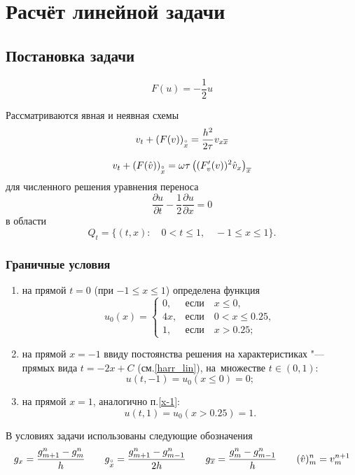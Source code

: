 \newpage
\section{Расчёт линейной задачи}

\subsection{Постановка задачи}
\[
F(u) = -\frac{1}{2} u
\]

Рассматриваются явная и неявная схемы
\begin{equation}\label{one}
v_t + (F(v))_{ \overset{\circ}{x} } = \frac{h^2}{2\tau} v_{x \overline{x}}
\end{equation}

\begin{equation}\label{two}
v_t + (F(\hat{v}))_{ \overset{\circ}{x} } = \omega \tau \left((F'_v(v))^2 \hat{v}_x \right)_{\overline{x}}
\end{equation}
для численного решения уравнения переноса 
\[
\frac{\partial u}{\partial t} - \frac{1}{2} 
\frac{\partial u}{\partial x} = 0
\]
в области
\begin{equation}\label{line}
Q_t = \{(t,x): \quad 0<t \le 1, \quad -1 \le x \le 1 \}.
\end{equation}

\subsubsection{Граничные условия}
\begin{enumerate}
\item на прямой $t = 0$ (при $-1 \le x \le 1$) определена функция
\begin{equation}\label{gran}
u_0(x) = 
\begin{cases}
0,& \text{если} \quad x \le 0, \\
4x,& \text{если} \quad 0 < x \le 0.25, \\
1,& \text{если} \quad x > 0.25;
\end{cases}
\end{equation}
\item\label{x-1} на прямой $x = -1$ ввиду постоянства решения на характеристиках "--- прямых вида $t = -2x + C$ (см.\ref{harr_lin}), на~множестве $t \in (0,1)$:
\[
u(t,-1) = u_0(x \le 0) = 0;
\]
\item на прямой $x = 1$, аналогично п.\ref{x-1}:
\[
u(t,1) = u_0(x > 0.25) = 1.
\]
\end{enumerate}

В условиях задачи использованы следующие обозначения
\[
g_x = \frac{g_{m+1}^n - g_m^n}{h} \qquad 
g_{\overset{\circ}{x}} = \frac{g_{m+1}^n - g_{m-1}^n}{2h} \qquad
g_{\overline{x}} = \frac{g_{m}^n - g_{m-1}^n}{h} \qquad
(\hat{v})_{m}^n = v_{m}^{n+1}
\]

